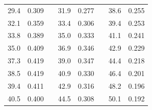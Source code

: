 \documentclass[a4paper,12pt]{article} %
\begin{document}
\begin{table}[h!]
\begin{tabular}{cclcclcc}
				\multicolumn{1}{|c|}{29.4}               & \multicolumn{1}{c|}{0.309} & \multicolumn{1}{l|}{} & \multicolumn{1}{c|}{31.9}       & \multicolumn{1}{c|}{0.277} & \multicolumn{1}{l|}{} & \multicolumn{1}{c|}{38.6}       & \multicolumn{1}{c|}{0.255} \\ \cline{1-2} \cline{4-5} \cline{7-8} 
				\multicolumn{1}{|c|}{32.1}               & \multicolumn{1}{c|}{0.359} & \multicolumn{1}{l|}{} & \multicolumn{1}{c|}{33.4}       & \multicolumn{1}{c|}{0.306} & \multicolumn{1}{l|}{} & \multicolumn{1}{c|}{39.4}       & \multicolumn{1}{c|}{0.253} \\ \cline{1-2} \cline{4-5} \cline{7-8} 
				\multicolumn{1}{|c|}{33.8}               & \multicolumn{1}{c|}{0.389} & \multicolumn{1}{l|}{} & \multicolumn{1}{c|}{35.0}       & \multicolumn{1}{c|}{0.333} & \multicolumn{1}{l|}{} & \multicolumn{1}{c|}{41.1}       & \multicolumn{1}{c|}{0.241} \\ \cline{1-2} \cline{4-5} \cline{7-8} 
				\multicolumn{1}{|c|}{35.0}               & \multicolumn{1}{c|}{0.409} & \multicolumn{1}{l|}{} & \multicolumn{1}{c|}{36.9}       & \multicolumn{1}{c|}{0.346} & \multicolumn{1}{l|}{} & \multicolumn{1}{c|}{42.9}       & \multicolumn{1}{c|}{0.229} \\ \cline{1-2} \cline{4-5} \cline{7-8} 
				\multicolumn{1}{|c|}{37.3}               & \multicolumn{1}{c|}{0.419} & \multicolumn{1}{l|}{} & \multicolumn{1}{c|}{39.0}       & \multicolumn{1}{c|}{0.347} & \multicolumn{1}{l|}{} & \multicolumn{1}{c|}{44.4}       & \multicolumn{1}{c|}{0.218} \\ \cline{1-2} \cline{4-5} \cline{7-8} 
				\multicolumn{1}{|c|}{38.5}               & \multicolumn{1}{c|}{0.419} & \multicolumn{1}{l|}{} & \multicolumn{1}{c|}{40.9}       & \multicolumn{1}{c|}{0.330} & \multicolumn{1}{l|}{} & \multicolumn{1}{c|}{46.4}       & \multicolumn{1}{c|}{0.201} \\ \cline{1-2} \cline{4-5} \cline{7-8} 
				\multicolumn{1}{|c|}{39.4}               & \multicolumn{1}{c|}{0.411} & \multicolumn{1}{l|}{} & \multicolumn{1}{c|}{42.9}       & \multicolumn{1}{c|}{0.316} & \multicolumn{1}{l|}{} & \multicolumn{1}{c|}{48.2}       & \multicolumn{1}{c|}{0.196} \\ \cline{1-2} \cline{4-5} \cline{7-8} 
				\multicolumn{1}{|c|}{40.5}               & \multicolumn{1}{c|}{0.400} & \multicolumn{1}{l|}{} & \multicolumn{1}{c|}{44.5}       & \multicolumn{1}{c|}{0.308} & \multicolumn{1}{l|}{} & \multicolumn{1}{c|}{50.1}       & \multicolumn{1}{c|}{0.192} \\ \cline{1-2} \cline{4-5} \cline{7-8} 

\end{tabular}
\end{table}
\end{document}
